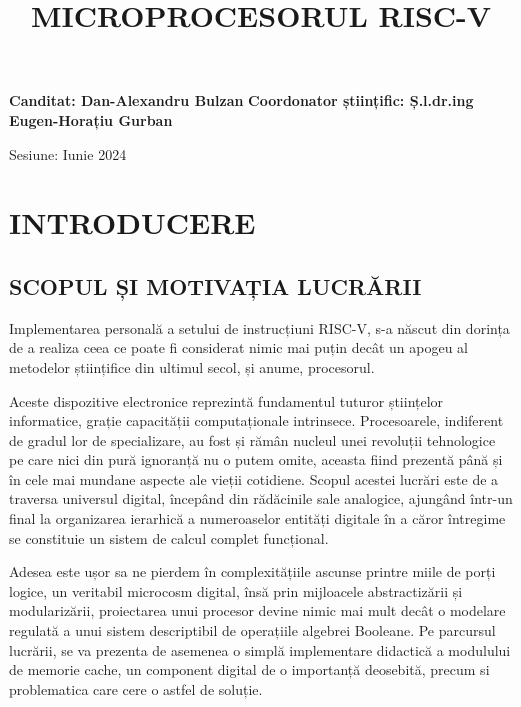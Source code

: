 \documentclass[12pt]{article}
\begin{document}
\fontsize{20pt}{18pt}\selectfont
\title{\textbf{MICROPROCESORUL RISC-V}}

\date{}
\begin{titlingpage}
\maketitle


\begingroup
    \fontsize{14pt}{12pt}\selectfont
	\textbf{Canditat: Dan-Alexandru Bulzan}
	\bigbreak
	\textbf{Coordonator științific: Ș.l.dr.ing Eugen-Horațiu Gurban}
\endgroup


\vspace*{\fill}
\begin{center}
\fontsize{14pt}{12pt}\selectfont
Sesiune: Iunie 2024
\end{center}
\end{titlingpage}

\newpage
\section{\centering INTRODUCERE}
\bigbreak
\subsection{SCOPUL ȘI MOTIVAȚIA LUCRĂRII}

Implementarea personală a setului de instrucțiuni RISC-V, s-a născut din dorința de a realiza ceea ce poate fi considerat nimic mai puțin decât un apogeu al metodelor științifice din ultimul secol, și anume, procesorul.

Aceste dispozitive electronice reprezintă fundamentul tuturor științelor informatice, grație capacității computaționale intrinsece. Procesoarele, indiferent de gradul lor de specializare, au fost și rămân nucleul unei revoluții tehnologice pe care nici din pură ignoranță nu o putem omite, aceasta fiind prezentă până și în cele mai mundane aspecte ale vieții cotidiene.
Scopul acestei lucrări este de a traversa universul digital, începând din rădăcinile sale analogice, ajungând într-un final la organizarea ierarhică a numeroaselor entități digitale în a căror întregime se constituie un sistem de calcul complet funcțional.

Adesea este ușor sa ne pierdem în complexitățiile ascunse printre miile de porți logice, un veritabil microcosm digital, însă prin mijloacele abstractizării și modularizării, proiectarea unui procesor devine nimic mai mult decât o modelare regulată a unui sistem descriptibil de operațiile algebrei Booleane. Pe parcursul lucrării, se va prezenta de asemenea o simplă implementare didactică a modulului de memorie cache, un component digital de o importanță deosebită, precum si problematica care cere o astfel de soluție.
\end{document}
